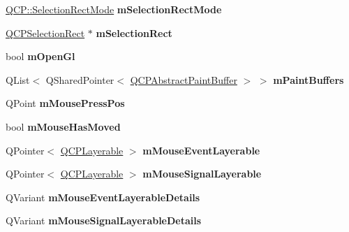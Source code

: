 \begin{DoxyCompactItemize}
\item 
\mbox{\label{classQCustomPlot_abe04c5def373cc4fede8de20542ca3f2}} 
\hyperlink{namespaceQCP_ac9aa4d6d81ac76b094f9af9ad2d3aacf}{Q\+C\+P\+::\+Selection\+Rect\+Mode} {\bfseries m\+Selection\+Rect\+Mode}
\item 
\mbox{\label{classQCustomPlot_a4827bc84ef5ce52dfbf9ff630ed1b276}} 
\hyperlink{classQCPSelectionRect}{Q\+C\+P\+Selection\+Rect} $\ast$ {\bfseries m\+Selection\+Rect}
\item 
\mbox{\label{classQCustomPlot_a0841dbea13bd120d20e3f0cc36767ff9}} 
bool {\bfseries m\+Open\+Gl}
\item 
\mbox{\label{classQCustomPlot_a57b270b1e3990e0d1b9fb39b137d5a5d}} 
Q\+List$<$ Q\+Shared\+Pointer$<$ \hyperlink{classQCPAbstractPaintBuffer}{Q\+C\+P\+Abstract\+Paint\+Buffer} $>$ $>$ {\bfseries m\+Paint\+Buffers}
\item 
\mbox{\label{classQCustomPlot_ac57090da95056ae4dd67be67adfa85bd}} 
Q\+Point {\bfseries m\+Mouse\+Press\+Pos}
\item 
\mbox{\label{classQCustomPlot_ad2108936f001a8be5974b0b6ff13dae3}} 
bool {\bfseries m\+Mouse\+Has\+Moved}
\item 
\mbox{\label{classQCustomPlot_a243867f445d2f4e35e00add2f589e1da}} 
Q\+Pointer$<$ \hyperlink{classQCPLayerable}{Q\+C\+P\+Layerable} $>$ {\bfseries m\+Mouse\+Event\+Layerable}
\item 
\mbox{\label{classQCustomPlot_adf81640dbf365bd4fa22494e3e504e70}} 
Q\+Pointer$<$ \hyperlink{classQCPLayerable}{Q\+C\+P\+Layerable} $>$ {\bfseries m\+Mouse\+Signal\+Layerable}
\item 
\mbox{\label{classQCustomPlot_ad604958ef16fc022c474521a08d88a2d}} 
Q\+Variant {\bfseries m\+Mouse\+Event\+Layerable\+Details}
\item 
\mbox{\label{classQCustomPlot_a2f313604bb22781633137915f3c100e6}} 
Q\+Variant {\bfseries m\+Mouse\+Signal\+Layerable\+Details}
\item 

\end{DoxyCompactItemize}
